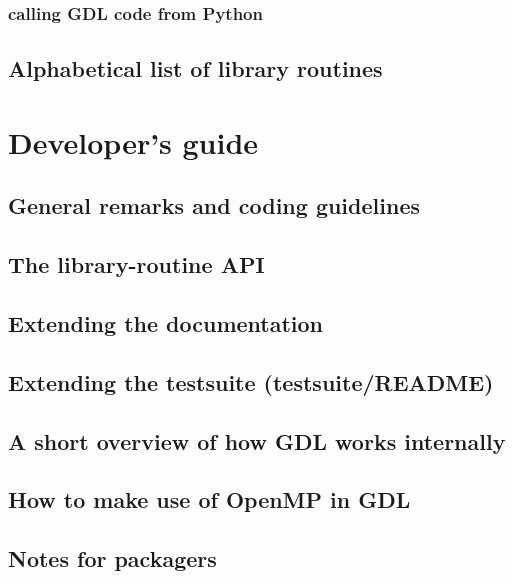 \documentclass[10pt,titleauthor,openany]{mwbk}
\begin{document}
  \section{calling GDL code from Python}
  

  \onecolumn
  \chapter{Alphabetical list of library routines}
  {
    \secondarysize
    \begin{multicols}{2}{}
    \end{multicols}
  }

  \part{Developer's guide}
  \twocolumn

  \chapter{General remarks and coding guidelines}
  
 
  \chapter{The library-routine API}
  

  \chapter{Extending the documentation}
  
  \chapter{Extending the testsuite (testsuite/README)}
  
  \chapter{A short overview of how GDL works internally}
  

  \chapter{How to make use of OpenMP in GDL}
 
  \chapter{Notes for packagers}
\end{document}
